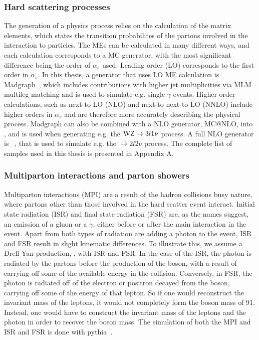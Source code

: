 \subsubsection*{Hard scattering processes}
\noindent
\justify
The generation of a physics process relies on the calculation of the matrix elements, which states the transition probabilites of the partons involved in the interaction to particles. 
The MEs can be calculated in many different ways, and each calculation corresponds to a MC generator, with the most significant difference being the order of $\alpha_{s}$ used. 
Leading order (LO) corresponds to the first order in $\alpha_{s}$. 
In this thesis, a generator that uses LO ME calculation is Madgraph~\cite{Alwall:2014hca}, which includes contributions with higher jet multiplicities via MLM~\cite{Mangano:2006rw} multileg matching and is used to simulate e.g. single $\gamma$ events.
Higher order calculations, such as next-to LO (NLO) and next-to-next-to LO (NNLO) include higher orders in $\alpha_{s}$ and are therefore more accurately describing the physical process. 
Madgraph can also be combined with a NLO generator, MC@NLO, into \MGvATNLO, and is used when generating e.g. the $\mathrm{W}\mathrm{Z}\rightarrow 3l1\nu$ process.
A full NLO generator is \POWHEG~\cite{Oleari:2010nx,Alioli:2009je}, that is used to simulate e.g. the \ttbar$\rightarrow2l2\nu$ process. 
The complete list of samples used in this thesis is presented in Appendix A.
\subsubsection*{Multiparton interactions and parton showers}
\noindent
\justify
Multiparton interactions (MPI) are a result of the hadron collisions busy nature, where partons other than those involved in the hard scatter event interact. 
Initial state radiation (ISR) and final state radiation (FSR) are, as the names suggest, an emission of a gluon or a $\gamma$, either before or after the main interaction in the event.
Apart from both types of radiation are adding a photon to the event, ISR and FSR result in slight kinematic differences. 
To illustrate this, we assume a Drell-Yan production, \Zee, with ISR and FSR. 
In the case of the ISR, the photon is radiated by the partons before the production of the \PZ boson, with a result of carrying off some of the available energy in the collision. 
Conversely, in FSR, the photon is radiated off of the electron or positron decayed from the \PZ boson, carrying off some of the energy of that lepton. 
So if one would reconstruct the invariant mass of the leptons, it would not completely form the \PZ boson mass of 91\GeV. 
Instead, one would have to construct the invariant mass of the leptons and the photon in order to recover the \PZ boson mass. 
The simulation of both the MPI and ISR and FSR is done with {\sc pythia}~\cite{Sjostrand:2014zea}. 
